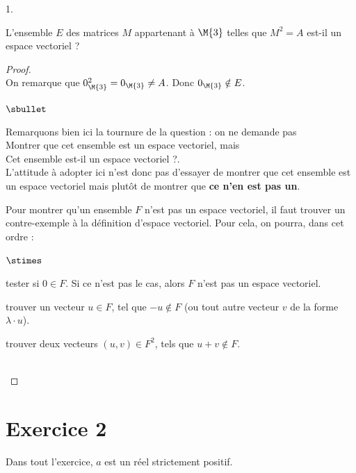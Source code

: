 \documentclass[11pt]{article}%
\begin{document}
\begin{noliste}{1.}
\item L'ensemble $E$ des matrices $M$ appartenant à $\M{3}$ telles que
  $M^2=A$ est-il un espace vectoriel ?

  \begin{proof}~\\
    On remarque que $0_{\M{3}}^2=0_{\M{3}}\neq A$. Donc $0_{\M{3}}
    \notin E$.%
    \begin{remark}
 \begin{noliste}{$\sbullet$}
  \item Remarquons bien ici la tournure de la question : on ne 
  demande pas\\ 
  \og Montrer que cet ensemble est un espace vectoriel\fg{}, mais \\
  \og Cet ensemble est-il un espace vectoriel ?\fg{}.\\
  L'attitude à adopter ici n'est donc pas d'essayer de montrer que cet 
  ensemble est un espace vectoriel mais plutôt de montrer que {\bf ce 
  n'en est pas un}.
  
  \item Pour montrer qu'un ensemble $F$ n'est pas un espace vectoriel, 
  il faut trouver un contre-exemple à la définition d'espace vectoriel. 
  Pour cela, on pourra, dans cet ordre :
  \begin{noliste}{$\stimes$}
    \item tester si $0\in F$. Si ce n'est pas le cas, alors $F$ n'est 
    pas un espace vectoriel.
    \item trouver un vecteur $u\in F$, tel que $-u\notin F$
    (ou tout autre vecteur $v$ de la forme $\lambda \cdot u$).
    \item trouver deux vecteurs $(u,v)\in F^2$, tels que $u+v\notin 
    F$.
  \end{noliste}
 \end{noliste}
\end{remark}~\\[-1.4cm]
\end{proof}
\end{noliste}




\newpage




\section*{Exercice 2}
\noindent
Dans tout l'exercice, $a$ est un réel strictement positif.
\end{document}

